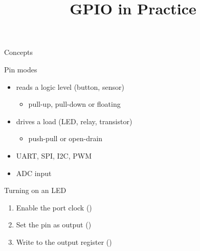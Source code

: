 \documentclass{slemanslides}
\title{GPIO in Practice}
\begin{document}
\cover


\begin{frame}{Concepts}

\end{frame}



\begin{frame}{Pin modes}
  \begin{itemize}
    \item {} reads a logic level (button, sensor)
      \begin{itemize}
        \item pull-up, pull-down or floating
      \end{itemize}
    \item {} drives a load (LED, relay, transistor)
      \begin{itemize}
        \item push-pull or open-drain
      \end{itemize}
    \item {} UART, SPI, I2C, PWM
    \item {} ADC input
  \end{itemize}
\end{frame}




\begin{frame}{Turning on an LED}
  \begin{enumerate}
    \item Enable the port clock ()
    \item Set the pin as output ()
    \item Write to the output register ()
  \end{enumerate}

\end{frame}
\end{document}
